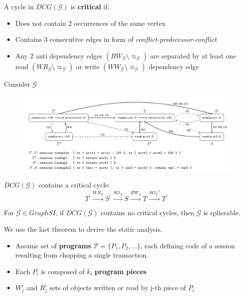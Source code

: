 \documentclass{beamer}
\begin{document}
\begin{frame}
	\begin{definition}
		A cycle in $DCG(\mathcal{G})$ is \textbf{critical} if:
		\begin{itemize}
			\item Does not contain 2 occurrences of the same vertex 
			\item Contains 3 consecutive edges in form of \textsl{conflict-predecessor-conflict}
			\item Any 2 anti dependency edges $(RW_\mathcal{G}\setminus \approx_\mathcal{G})$ are separated by at least one read $(WR_\mathcal{G}\setminus \approx_\mathcal{G})$ or write $(WW_\mathcal{G}\setminus \approx_\mathcal{G})$ dependency edge
		\end{itemize}
	\end{definition}
\end{frame}


\begin{frame}
	Consider $\mathcal{G}$
	\begin{figure}
		\includegraphics[scale=0.25]{fig4}
	\end{figure}
	\begin{example}
		$DCG(\mathcal{G})$ contains a critical cycle:
		$$ T^\prime \xrightarrow{WR_\mathcal{G}} S^\prime \xrightarrow{SO_\mathcal{G}} S \xrightarrow{RW_\mathcal{G}} T \xrightarrow{SO^{-1}_\mathcal{G}} T^\prime$$
	\end{example}
\end{frame}


\begin{frame}
	\begin{theorem}
		For $\mathcal{G} \in GraphSI$, if $DCG(\mathcal{G})$ contains no critical cycles, then $\mathcal{G}$ is spliceable.
	\end{theorem}
\end{frame}


\begin{frame}
We use the last theorem to derive the static analysis.
\begin{itemize}
	\item Assume set of \textbf{programs} $\mathcal{P}=\{P_1, P_2, \dots\}$, each defining code of a session resulting from chopping a single transaction.
	\item Each $P_i$ is composed of $k_i$ \textbf{program pieces}
	\item $W^i_j$ and $R^i_j$ sets of objects written or read by j-th piece of $P_i$ 
\end{itemize}
\end{frame}
\end{document}
